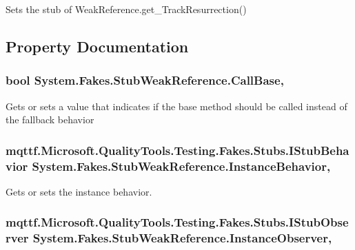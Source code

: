 Sets the stub of Weak\-Reference.\-get\-\_\-\-Track\-Resurrection()



\subsection{Property Documentation}
\hypertarget{class_system_1_1_fakes_1_1_stub_weak_reference_a5d9e112381b8ab3da48f3da56f5eb8aa}{
\subsubsection[{Call\-Base}]{\setlength{\rightskip}{0pt plus 5cm}bool System.\-Fakes.\-Stub\-Weak\-Reference.\-Call\-Base\hspace{0.3cm}{\ttfamily [get]}, {\ttfamily [set]}}}\label{class_system_1_1_fakes_1_1_stub_weak_reference_a5d9e112381b8ab3da48f3da56f5eb8aa}


Gets or sets a value that indicates if the base method should be called instead of the fallback behavior

\hypertarget{class_system_1_1_fakes_1_1_stub_weak_reference_ace05e025b4d43452e24d0622113eb7db}{
\subsubsection[{Instance\-Behavior}]{\setlength{\rightskip}{0pt plus 5cm}mqttf.\-Microsoft.\-Quality\-Tools.\-Testing.\-Fakes.\-Stubs.\-I\-Stub\-Behavior System.\-Fakes.\-Stub\-Weak\-Reference.\-Instance\-Behavior\hspace{0.3cm}{\ttfamily [get]}, {\ttfamily [set]}}}\label{class_system_1_1_fakes_1_1_stub_weak_reference_ace05e025b4d43452e24d0622113eb7db}


Gets or sets the instance behavior.

\hypertarget{class_system_1_1_fakes_1_1_stub_weak_reference_aad7ec97e86533951d83a199be94c6781}{
\subsubsection[{Instance\-Observer}]{\setlength{\rightskip}{0pt plus 5cm}mqttf.\-Microsoft.\-Quality\-Tools.\-Testing.\-Fakes.\-Stubs.\-I\-Stub\-Observer System.\-Fakes.\-Stub\-Weak\-Reference.\-Instance\-Observer\hspace{0.3cm}{\ttfamily [get]}, {\ttfamily [set]}}}\label{class_system_1_1_fakes_1_1_stub_weak_reference_aad7ec97e86533951d83a199be94c6781}


